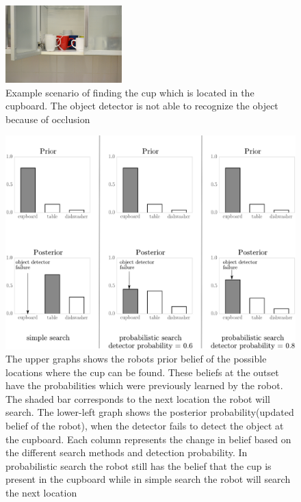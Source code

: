 \begin{figure}[tp]
\centering
\includegraphics[width=0.4\textwidth]{images/cup_cupboard.jpg}
\caption[Probabilistic search example]{Example scenario of finding the cup which is located in the cupboard. The object detector is not able to recognize the object because of occlusion}
\label{fig:cup_in_cupboard}
\end{figure}
\begin{figure}[htp]
\centering
\includegraphics[width=\textwidth]{images/search.png}
\caption[Probabilistic search scenario]{The upper graphs shows the robots prior belief of the possible locations where the cup can be found. These beliefs at the outset have the probabilities which were previously learned by the robot. The shaded bar corresponds to the next location the robot will search. The lower-left graph shows the posterior probability(updated belief of the robot), when the detector fails to detect the object at the cupboard. Each column represents the change in belief based on the different search methods and detection probability. In probabilistic search the robot still has the belief that the cup is present in the cupboard while in simple search the robot will search the next location}

\label{fig:search_results}
\end{figure}

